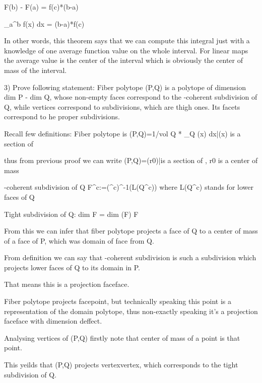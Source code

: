 	F(b) - F(a) = f(c)*(b-a) 	
	
	\implies \int_{a}^{b} f(x) dx = (b-a)*f(c)
	
	In other words, this theorem says that we can compute this integral just with a knowledge of one average function value on the whole interval. For linear maps the average value is the center of the interval which is obviously the center of mass of the interval.
	
3)	Prove following statement: Fiber polytope \Sigma(P,Q) is a polytope of dimension dim P - dim Q, whose non-empty faces correspond to the \pi-coherent subdivision of Q, while vertices correspond to subdivisions, which are thigh ones. Its facets correspond to he proper subdivisions.

	Recall few definitions:
	Fiber polytope is  \Sigma(P,Q)={1/vol Q * \int_{Q} \gamma(x) dx|\gamma(x) is a section of \pi}
	
	thus from previous proof we can write
	\Sigma(P,Q)={\gamma(r0)|\gamma is a section of \pi, r0 is a center of mass}
	
	\pi-coherent subdivision of Q
	F^c:=(\pi^c)^-1(L(Q^c))
	where L(Q^c) stands for lower faces of Q
	
	Tight subdivision of Q:
	dim F = dim \pi(F) \forall F
	
	From this we can infer that fiber polytope projects a face of Q to a center of mass of a face of P, which was domain of face from Q.
	
	From definition we can say that \pi-coherent subdivision is such a subdivision which projects lower faces of Q to its domain in P.
	
	That means this is a projection face\to face. 
	
	Fiber polytope projects face\to point, but technically speaking this point is a representation of the domain polytope, thus non-exactly speaking it's a projection face\to face with dimension deffect.
	
	Analysing vertices of \Sigma(P,Q) firstly note that center of mass of a point is that point. 
	
	This yeilds that \Sigma(P,Q) projects vertex\to vertex, which corresponds to the tight subdivision of Q.